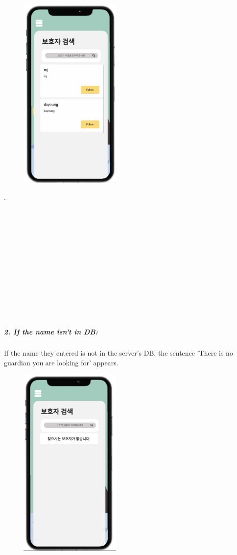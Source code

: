 \documentclass[conference]{IEEEtran}
\begin{document}
\begin{figure}[h!]
\centering
\includegraphics[width=5cm]{final_image_folder/bohoja_result.png}
\caption{}
\label{fig:map}
\end{figure}
.\\
\\
\\
\\
\\
\\
\\
\\
\\
\\
\\
\\
\\

\subparagraph{2. If the name isn't in DB: }
If the name they entered is not in the server's DB, the sentence 'There is no guardian you are looking for' appears.\\

\begin{figure}[h!]
\centering
\includegraphics[width=5cm]{final_image_folder/bohoja_noresult.png}
\caption{}
\label{fig:map}
\end{figure}
\end{document}
